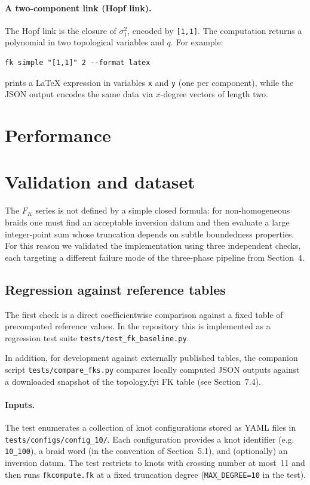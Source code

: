 \documentclass[twocolumn]{article}
\begin{document}
\paragraph{A two-component link (Hopf link).}
The Hopf link is the closure of $\sigma_1^2$, encoded by \texttt{[1,1]}.
The computation returns a polynomial in two topological variables and $q$.
For example:
\begin{verbatim}
fk simple "[1,1]" 2 --format latex
\end{verbatim}
prints a LaTeX expression in variables \texttt{x} and \texttt{y} (one per
component), while the JSON output encodes the same data via $x$-degree vectors
of length two.

\section{Performance}

\section{Validation and dataset}

The $F_K$ series is not defined by a simple closed formula: for non-homogeneous
braids one must find an acceptable inversion datum and then evaluate a large
integer-point sum whose truncation depends on subtle boundedness properties.
For this reason we validated the implementation using three independent checks,
each targeting a different failure mode of the three-phase pipeline from
Section~4.

\subsection{Regression against reference tables}

The first check is a direct coefficientwise comparison against a fixed table of
precomputed reference values.
In the repository this is implemented as a regression test suite
\texttt{tests/test\_fk\_baseline.py}.

In addition, for development against externally published tables, the companion
script \texttt{tests/compare\_fks.py} compares locally computed JSON outputs
against a downloaded snapshot of the topology.fyi FK table (see
Section~7.4).

\paragraph{Inputs.}
The test enumerates a collection of knot configurations stored as YAML files in
\texttt{tests/configs/config\_10/}.
Each configuration provides a knot identifier (e.g. \texttt{10\_100}), a braid
word (in the convention of Section~5.1), and (optionally) an inversion datum.
The test restricts to knots with crossing number at most~11 and then runs
\texttt{fkcompute.fk} at a fixed truncation degree (\texttt{MAX\_DEGREE=10} in
the test).
\end{document}
